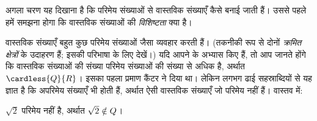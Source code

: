 \documentclass[../../../include/open-logic-section]{subfiles}
\begin{document}

अगला चरण यह दिखाना है कि परिमेय संख्याओं से वास्तविक संख्याएँ कैसे बनाई जाती
हैं। उससे पहले हमें समझना होगा कि वास्तविक संख्याओं की
\emph{विशिष्टता} क्या है।

वास्तविक संख्याएँ बहुत कुछ परिमेय संख्याओं जैसा व्यवहार करती हैं। (तकनीकी
रूप से दोनों \emph{क्रमित क्षेत्रों} के उदाहरण हैं; इसकी परिभाषा के लिए
 देखें।) यदि आपने  के
अभ्यास किए हैं, तो आप जानते होंगे कि वास्तविक संख्याओं की संख्या परिमेय
संख्याओं की संख्या से अधिक है, अर्थात $\cardless{\Rat}{\Real}$। इसका पहला प्रमाण कैंटर ने
दिया था। लेकिन लगभग ढाई सहस्राब्दियों से यह ज्ञात है कि अपरिमेय संख्याएँ भी
होती हैं, अर्थात ऐसी वास्तविक संख्याएँ जो परिमेय नहीं हैं। वास्तव में:
\begin{thm}
$\sqrt{2}$ परिमेय नहीं है, अर्थात $\sqrt{2} \notin Q$।
\end{thm}
\end{document}
